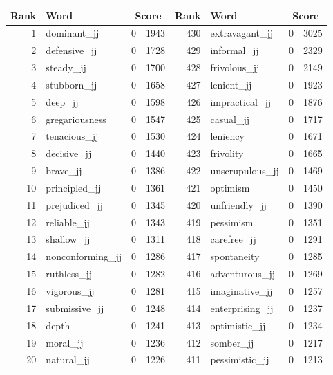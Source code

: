 \begin{table}[tbp]
    \begin{tabular}{| rlr@{.}l | rlr@{.}l |}
    \hline
    \textbf{Rank} & \textbf{Word} & \multicolumn{2}{c|}{\textbf{Score}} & \textbf{Rank} & \textbf{Word} & \multicolumn{2}{c|}{\textbf{Score}} \\
    \hline
    1 & dominant\_jj & 0 & 1943    &    430 & extravagant\_jj & 0 & 3025 \\
    2 & defensive\_jj & 0 & 1728    &    429 & informal\_jj & 0 & 2329 \\
    3 & steady\_jj & 0 & 1700    &    428 & frivolous\_jj & 0 & 2149 \\
    4 & stubborn\_jj & 0 & 1658    &    427 & lenient\_jj & 0 & 1923 \\
    5 & deep\_jj & 0 & 1598    &    426 & impractical\_jj & 0 & 1876 \\
    6 & gregariousness & 0 & 1547    &    425 & casual\_jj & 0 & 1717 \\
    7 & tenacious\_jj & 0 & 1530    &    424 & leniency & 0 & 1671 \\
    8 & decisive\_jj & 0 & 1440    &    423 & frivolity & 0 & 1665 \\
    9 & brave\_jj & 0 & 1386    &    422 & unscrupulous\_jj & 0 & 1469 \\
    10 & principled\_jj & 0 & 1361    &    421 & optimism & 0 & 1450 \\
    11 & prejudiced\_jj & 0 & 1345    &    420 & unfriendly\_jj & 0 & 1390 \\
    12 & reliable\_jj & 0 & 1343    &    419 & pessimism & 0 & 1351 \\
    13 & shallow\_jj & 0 & 1311    &    418 & carefree\_jj & 0 & 1291 \\
    14 & nonconforming\_jj & 0 & 1286    &    417 & spontaneity & 0 & 1285 \\
    15 & ruthless\_jj & 0 & 1282    &    416 & adventurous\_jj & 0 & 1269 \\
    16 & vigorous\_jj & 0 & 1281    &    415 & imaginative\_jj & 0 & 1257 \\
    17 & submissive\_jj & 0 & 1248    &    414 & enterprising\_jj & 0 & 1237 \\
    18 & depth & 0 & 1241    &    413 & optimistic\_jj & 0 & 1234 \\
    19 & moral\_jj & 0 & 1236    &    412 & somber\_jj & 0 & 1217 \\
    20 & natural\_jj & 0 & 1226    &    411 & pessimistic\_jj & 0 & 1213 \\

\end{tabular}
\end{table}
